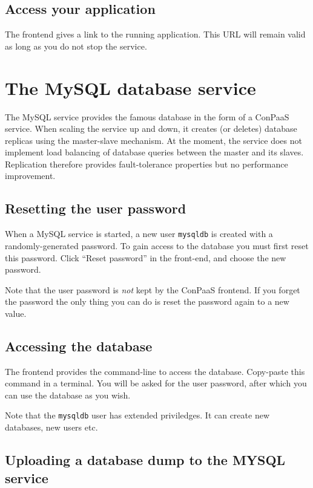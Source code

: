 \documentclass[10pt]{article}
\begin{document}
\subsection{Access your application}

The frontend gives a link to the running application. This URL will
remain valid as long as you do not stop the service.


\section{The MySQL database service}

The MySQL service provides the famous database in the form of a
ConPaaS service. When scaling the service up and down, it creates (or
deletes) database replicas using the master-slave mechanism. At the
moment, the service does not implement load balancing of database
queries between the master and its slaves. Replication therefore
provides fault-tolerance properties but no performance improvement.

\subsection{Resetting the user password}

When a MySQL service is started, a new user \texttt{mysqldb} is
created with a randomly-generated password. To gain access to the
database you must first reset this password. Click ``Reset password''
in the front-end, and choose the new password.

Note that the user password is \emph{not} kept by the ConPaaS
frontend. If you forget the password the only thing you can do is
reset the password again to a new value.

\subsection{Accessing the database} 

The frontend provides the command-line to access the database.
Copy-paste this command in a terminal. You will be asked for the user
password, after which you can use the database as you wish.

Note that the \texttt{mysqldb} user has extended priviledges. It can
create new databases, new users etc.

\subsection{Uploading a database dump to the MYSQL service}
\end{document}
